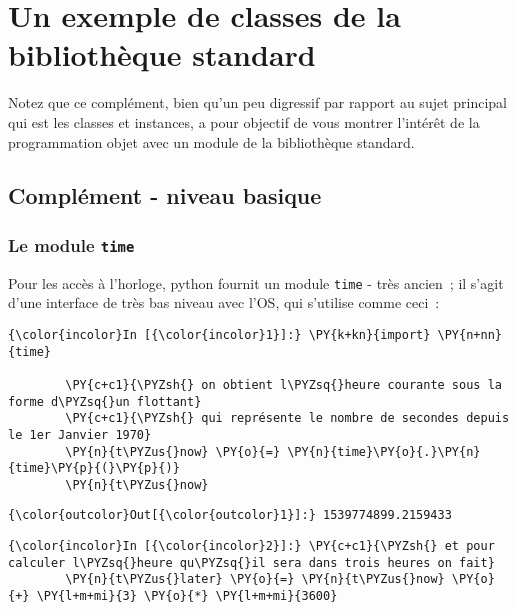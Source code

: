     \hypertarget{un-exemple-de-classes-de-la-bibliothuxe8que-standard}{%
\section{Un exemple de classes de la bibliothèque
standard}\label{un-exemple-de-classes-de-la-bibliothuxe8que-standard}}

    Notez que ce complément, bien qu'un peu digressif par rapport au sujet
principal qui est les classes et instances, a pour objectif de vous
montrer l'intérêt de la programmation objet avec un module de la
bibliothèque standard.

    \hypertarget{compluxe9ment---niveau-basique}{%
\subsection{Complément - niveau
basique}\label{compluxe9ment---niveau-basique}}

    \hypertarget{le-module-time}{%
\subsubsection{\texorpdfstring{Le module
\texttt{time}}{Le module time}}\label{le-module-time}}

    Pour les accès à l'horloge, python fournit un module \texttt{time} -
très ancien~; il s'agit d'une interface de très bas niveau avec l'OS,
qui s'utilise comme ceci~:

    \begin{Verbatim}[commandchars=\\\{\}]
{\color{incolor}In [{\color{incolor}1}]:} \PY{k+kn}{import} \PY{n+nn}{time}
        
        \PY{c+c1}{\PYZsh{} on obtient l\PYZsq{}heure courante sous la forme d\PYZsq{}un flottant}
        \PY{c+c1}{\PYZsh{} qui représente le nombre de secondes depuis le 1er Janvier 1970}
        \PY{n}{t\PYZus{}now} \PY{o}{=} \PY{n}{time}\PY{o}{.}\PY{n}{time}\PY{p}{(}\PY{p}{)}
        \PY{n}{t\PYZus{}now}
\end{Verbatim}


\begin{Verbatim}[commandchars=\\\{\}]
{\color{outcolor}Out[{\color{outcolor}1}]:} 1539774899.2159433
\end{Verbatim}
            
    \begin{Verbatim}[commandchars=\\\{\}]
{\color{incolor}In [{\color{incolor}2}]:} \PY{c+c1}{\PYZsh{} et pour calculer l\PYZsq{}heure qu\PYZsq{}il sera dans trois heures on fait}
        \PY{n}{t\PYZus{}later} \PY{o}{=} \PY{n}{t\PYZus{}now} \PY{o}{+} \PY{l+m+mi}{3} \PY{o}{*} \PY{l+m+mi}{3600}
\end{Verbatim}


